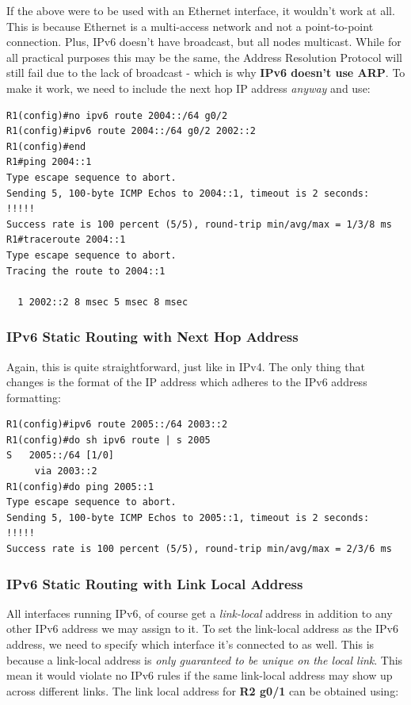 \noindent
If the above were to be used with an Ethernet interface, it wouldn't work at all. This is because Ethernet is a multi-access network and not a point-to-point connection. Plus, IPv6 doesn't have broadcast, but all nodes multicast. While for all practical purposes this may be the same, the Address Resolution Protocol will still fail due to the lack of broadcast - which is why \textbf{IPv6 doesn't use ARP}. To make it work, we need to include the next hop IP address \textit{anyway} and use: 

\vspace{-15pt}
\begin{verbatim}
R1(config)#no ipv6 route 2004::/64 g0/2
R1(config)#ipv6 route 2004::/64 g0/2 2002::2
R1(config)#end
R1#ping 2004::1
Type escape sequence to abort.
Sending 5, 100-byte ICMP Echos to 2004::1, timeout is 2 seconds:
!!!!!
Success rate is 100 percent (5/5), round-trip min/avg/max = 1/3/8 ms
R1#traceroute 2004::1
Type escape sequence to abort.
Tracing the route to 2004::1

  1 2002::2 8 msec 5 msec 8 msec
\end{verbatim}
\vspace{-10pt}

\subsubsection{IPv6 Static Routing with Next Hop Address}
Again, this is quite straightforward, just like in IPv4. The only thing that changes is the format of the IP address which adheres to the IPv6 address formatting:

\vspace{-15pt}
\begin{verbatim}
R1(config)#ipv6 route 2005::/64 2003::2
R1(config)#do sh ipv6 route | s 2005
S   2005::/64 [1/0]
     via 2003::2
R1(config)#do ping 2005::1
Type escape sequence to abort.
Sending 5, 100-byte ICMP Echos to 2005::1, timeout is 2 seconds:
!!!!!
Success rate is 100 percent (5/5), round-trip min/avg/max = 2/3/6 ms
\end{verbatim}
\vspace{-10pt}

\subsubsection{IPv6 Static Routing with Link Local Address}
All interfaces running IPv6, of course get a \textit{link-local} address in addition to any other IPv6 address we may assign to it. To set the link-local address as the IPv6 address, we need to specify which interface it's connected to as well. This is because a link-local address is \textit{only guaranteed to be unique on the local link}. This mean it would violate no IPv6 rules if the same link-local address may show up across different links. The link local address for \textbf{R2 g0/1} can be obtained using: 

